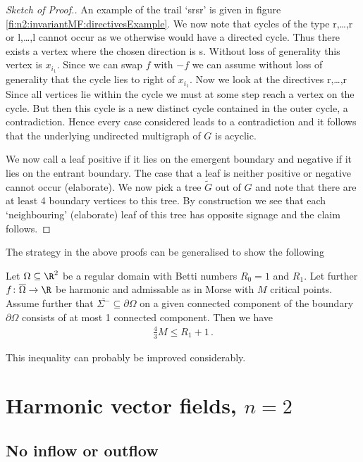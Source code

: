 \begin{proof}[Sketch of Proof.]
  An example of the trail `srsr' is given in figure \ref{fi:n2:invariantMF:directivesExample}.
  We now note that cycles of the type r,\dots,r or l,\dots,l
  cannot occur as we otherwise would have a directed cycle. Thus there exists a vertex where the chosen direction is s. 
  Without loss of generality this vertex is $x_{i_1}$.
  Since we can swap $f$ with $-f$ we can assume without loss of generality that the cycle lies to right of $x_{i_1}$.
  Now we look at the directives r,\dots,r
  Since all vertices lie within the cycle we must at some step reach a vertex on the cycle. But then this cycle is a new distinct cycle
  contained in the outer cycle, a contradiction.
  Hence every case considered leads to a contradiction and it follows that the underlying undirected multigraph of $G$
  is acyclic.
  
  We now call a leaf positive if it lies on the emergent boundary and
  negative if it lies on the entrant boundary. The case that a leaf is neither positive or negative cannot occur (elaborate).
  We now pick a tree $\widetilde{G}$ out of $G$ and note that
  there are at least 4 boundary vertices to this tree.
  By construction we see that each `neighbouring' (elaborate) leaf of this tree
  has opposite signage and the claim follows.
\end{proof} 

The strategy in the above proofs can be generalised to show the following
\begin{conjecture}
  Let $\Omega\subseteq\R^2$ be a regular domain with Betti numbers $R_0=1$ and $R_1$.
  Let further $f\colon\overline{\Omega}\to\R$ be harmonic and admissable 
  as in Morse with $M$ critical points. Assume further that 
  $\overline{\Sigma^-}\subseteq\partial\Omega$ on a given connected component 
  of the boundary $\partial\Omega$
  consists of at most 1 connected component. Then we have
  \begin{align*}
    \frac{4}{3}M\leq R_1+1\,.
  \end{align*}
\end{conjecture}
This inequality can probably be improved considerably.

\newpage

\section*{Harmonic vector fields, $n=2$}

\subsection*{No inflow or outflow}

